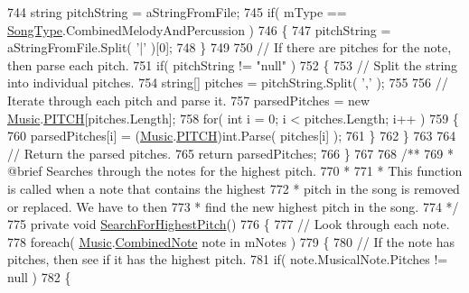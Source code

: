 \begin{DoxyCodeInclude}
744         \textcolor{keywordtype}{string} pitchString = aStringFromFile;
745         \textcolor{keywordflow}{if}( mType == \hyperlink{group___song_enums_gae681a1f001333e39fc1cb4fea97bfe1b}{SongType}.CombinedMelodyAndPercussion )
746         \{
747             pitchString = aStringFromFile.Split( \textcolor{charliteral}{'|'} )[0];
748         \}
749 
750         \textcolor{comment}{// If there are pitches for the note, then parse each pitch.}
751         \textcolor{keywordflow}{if}( pitchString != \textcolor{stringliteral}{"null"} )
752         \{
753             \textcolor{comment}{// Split the string into individual pitches.}
754             \textcolor{keywordtype}{string}[] pitches = pitchString.Split( \textcolor{charliteral}{','} );
755 
756             \textcolor{comment}{// Iterate through each pitch and parse it.}
757             parsedPitches = \textcolor{keyword}{new} \hyperlink{class_music}{Music}.\hyperlink{group___music_enums_ga508f69b199ea518f935486c990edac1d}{PITCH}[pitches.Length];
758             \textcolor{keywordflow}{for}( \textcolor{keywordtype}{int} i = 0; i < pitches.Length; i++ )
759             \{
760                 parsedPitches[i] = (\hyperlink{class_music}{Music}.\hyperlink{group___music_enums_ga508f69b199ea518f935486c990edac1d}{PITCH})\textcolor{keywordtype}{int}.Parse( pitches[i] );
761             \}
762         \}
763 
764         \textcolor{comment}{// Return the parsed pitches.}
765         \textcolor{keywordflow}{return} parsedPitches;
766     \}
767 \textcolor{comment}{}
768 \textcolor{comment}{    /**}
769 \textcolor{comment}{     * @brief Searches through the notes for the highest pitch. }
770 \textcolor{comment}{     * }
771 \textcolor{comment}{     * This function is called when a note that contains the highest}
772 \textcolor{comment}{     * pitch in the song is removed or replaced. We have to then}
773 \textcolor{comment}{     * find the new highest pitch in the song.}
774 \textcolor{comment}{    */}
775     \textcolor{keyword}{private} \textcolor{keywordtype}{void} \hyperlink{group___song_priv_func_ga5f837e6b7f576732fa38747caa057621}{SearchForHighestPitch}()
776     \{
777         \textcolor{comment}{// Look through each note.}
778         \textcolor{keywordflow}{foreach}( \hyperlink{class_music}{Music}.\hyperlink{group___music_structs_struct_music_1_1_combined_note}{CombinedNote} note in mNotes )
779         \{
780             \textcolor{comment}{// If the note has pitches, then see if it has the highest pitch.}
781             \textcolor{keywordflow}{if}( note.MusicalNote.Pitches != null )
782             \{

\end{DoxyCodeInclude}
